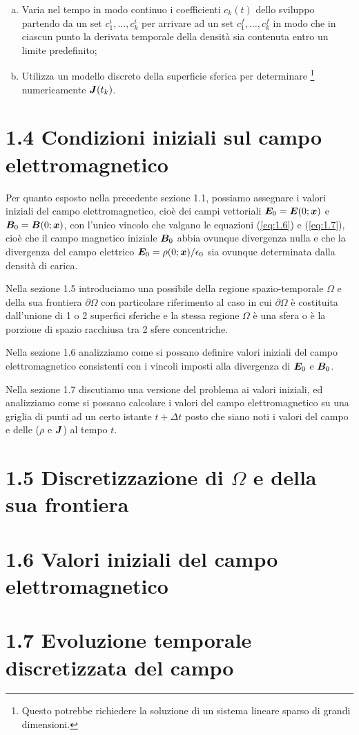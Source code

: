 \begin{enumerate}[(I)]
\begin{enumerate}[(a)]
	\item Varia nel tempo in modo continuo i coefficienti $c_k(t)$ dello sviluppo partendo da un set  $c^{i}_1, \ldots, c^{i}_k$ per arrivare ad un set  $c^{f}_1, \ldots, c^{f}_k$ in modo che in ciascun punto la derivata temporale della densità sia contenuta entro un limite predefinito;
	\item Utilizza un modello discreto della superficie sferica per determinare \footnote{Questo potrebbe richiedere la soluzione di un sistema lineare sparso di grandi dimensioni.} numericamente $\vb*{J}(t_k)$.
	\end{enumerate}
\end{enumerate}
\pagebreak
\section*{1.4 Condizioni iniziali sul campo elettromagnetico}\label{sec_1.4}
Per quanto esposto nella precedente sezione 1.1, possiamo assegnare i valori iniziali del campo elettromagnetico, cioè dei campi vettoriali $\vb*{E}_0 = \vb*{E}(0; \vb*{x})$ e $\vb*{B}_0 = \vb*{B}(0; \vb*{x})$, con l'unico vincolo che valgano le equazioni (\ref{eq:1.6}) e (\ref{eq:1.7}), cioè che il campo magnetico iniziale $\vb*{B}_0$ abbia ovunque divergenza nulla e che la divergenza del campo elettrico $\vb*{E}_0 = \rho(0; \vb*{x})/\epsilon_0$ sia ovunque determinata dalla densità di carica. 

Nella sezione 1.5 introduciamo una possibile  della regione spazio-temporale $\Omega$ e della sua frontiera $\partial \Omega$ con particolare riferimento al caso in cui  $\partial \Omega$ è costituita dall'unione di 1 o 2 superfici sferiche e la stessa regione $\Omega$ è una sfera o è la porzione di spazio racchiusa tra 2 sfere concentriche. 

Nella sezione 1.6 analizziamo come si possano definire valori iniziali del campo elettromagnetico consistenti con i vincoli imposti alla divergenza di $\vb*{E}_0$ e $\vb*{B}_0$.

Nella sezione 1.7 discutiamo una versione  del problema ai valori iniziali, ed analizziamo come si possano calcolare i valori del campo elettromagnetico su una griglia di punti ad un certo istante $t+\Delta t$ posto che siano noti i valori del campo e delle  ($\rho$ e $\vb*{J}$) al tempo $t$. 
 

\section*{1.5 Discretizzazione di $\Omega$ e della sua frontiera}\label{sec_1.5}


\section*{1.6 Valori iniziali del campo elettromagnetico}\label{sec_1.6}


\section*{1.7 Evoluzione temporale discretizzata del campo}\label{sec_1.6}

